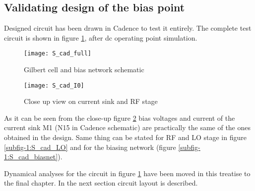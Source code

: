\subsection{Validating design of the bias point}
Designed circuit has been drawn in Cadence to test it entirely. The complete test circuit is shown in figure \ref{S_cad_full}, after dc operating point simulation.
\begin{figure}[H]
	\centering
	\texttt{[image: S\_cad\_full]}
	\caption{Gilbert cell and bias network schematic}
	\label{S_cad_full}
\end{figure}

\begin{figure}[H]
	\centering
	\texttt{[image: S\_cad\_I0]}
	\caption{Close up view on current sink and RF stage}
	\label{S_cad_I0}
\end{figure}
As it can be seen from the close-up figure \ref{S_cad_I0} bias voltages and current of the current sink M1 (N15 in Cadence schematic) are practically the same of the ones obtained in the design. Same thing can be stated for RF and LO stage in figure \ref{subfig-1:S_cad_LO} and for the biasing network (figure \ref{subfig-1:S_cad_biasnet}).
\begin{figure}[H]
	\centering
	\hfill
	\caption{}
\end{figure}

Dynamical analyses for the circuit in figure \ref{S_cad_full} have been moved in this treatise to the final chapter. In the next section circuit layout is described. 